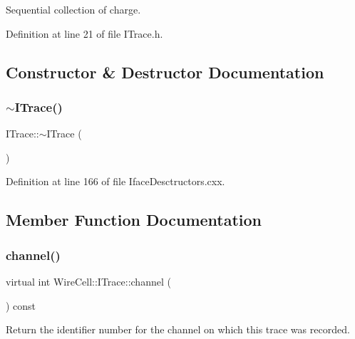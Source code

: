 Sequential collection of charge. 



Definition at line 21 of file I\+Trace.\+h.



\subsection{Constructor \& Destructor Documentation}
\mbox{\label{class_wire_cell_1_1_i_trace_a7ce72d715939df69a8daa5138d25e69f}} 
\subsubsection{\texorpdfstring{$\sim$\+I\+Trace()}{~ITrace()}}
{\footnotesize\ttfamily I\+Trace\+::$\sim$\+I\+Trace (\begin{DoxyParamCaption}{ }\end{DoxyParamCaption})\hspace{0.3cm}{\ttfamily [virtual]}}



Definition at line 166 of file Iface\+Desctructors.\+cxx.



\subsection{Member Function Documentation}
\mbox{\label{class_wire_cell_1_1_i_trace_ae5903cdd197baf3b0ea67d80685851cb}} 
\subsubsection{\texorpdfstring{channel()}{channel()}}
{\footnotesize\ttfamily virtual int Wire\+Cell\+::\+I\+Trace\+::channel (\begin{DoxyParamCaption}{ }\end{DoxyParamCaption}) const\hspace{0.3cm}{\ttfamily [pure virtual]}}

Return the identifier number for the channel on which this trace was recorded. 


